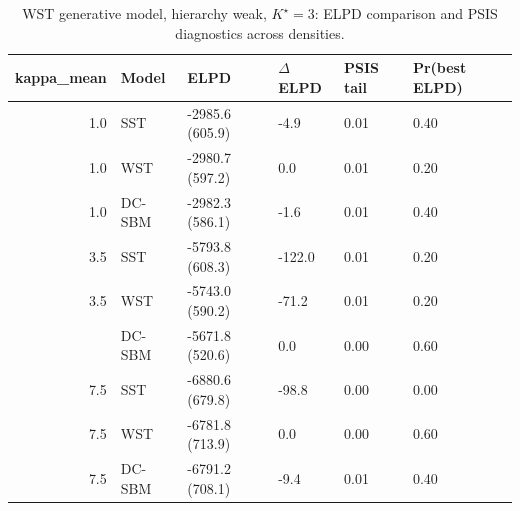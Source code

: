 \begin{table}
\centering
\caption{WST generative model, hierarchy weak, $K^\star=3$: ELPD comparison and PSIS diagnostics across densities.}
\centering
\begin{tabular}[t]{rlllll}
\toprule
kappa_mean & Model & ELPD & $\Delta$ELPD & PSIS tail & Pr(best ELPD)\\
\midrule
1.0 & SST & -2985.6 (605.9) & -4.9 & 0.01 & 0.40\\
1.0 & WST & -2980.7 (597.2) & 0.0 & 0.01 & 0.20\\
1.0 & DC-SBM & -2982.3 (586.1) & -1.6 & 0.01 & 0.40\\
3.5 & SST & -5793.8 (608.3) & -122.0 & 0.01 & 0.20\\
3.5 & WST & -5743.0 (590.2) & -71.2 & 0.01 & 0.20\\
\addlinespace
3.5 & DC-SBM & -5671.8 (520.6) & 0.0 & 0.00 & 0.60\\
7.5 & SST & -6880.6 (679.8) & -98.8 & 0.00 & 0.00\\
7.5 & WST & -6781.8 (713.9) & 0.0 & 0.00 & 0.60\\
7.5 & DC-SBM & -6791.2 (708.1) & -9.4 & 0.01 & 0.40\\
\bottomrule
\end{tabular}
\end{table}
